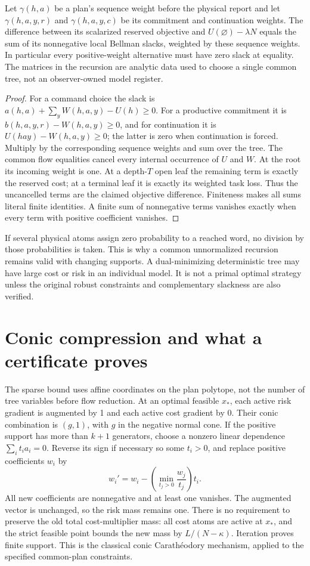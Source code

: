 \begin{proposition}\label{prop:supp-dual-slack}
Let $\gamma(h,a)$ be a plan's sequence weight before the physical report and let $\gamma(h,a,y,r)$ and $\gamma(h,a,y,c)$ be its commitment and continuation weights. The difference between its scalarized reserved objective and $U(\varnothing)-\lambda N$ equals the sum of its nonnegative local Bellman slacks, weighted by these sequence weights. In particular every positive-weight alternative must have zero slack at equality. The matrices in the recursion are analytic data used to choose a single common tree, not an observer-owned model register.
\end{proposition}
\begin{proof}
For a command choice the slack is
$a(h,a)+\sum_yW(h,a,y)-U(h)\ge0$.
For a productive commitment it is $b(h,a,y,r)-W(h,a,y)\ge0$, and for continuation it is $U(hay)-W(h,a,y)\ge0$; the latter is zero when continuation is forced. Multiply by the corresponding sequence weights and sum over the tree. The common flow equalities cancel every internal occurrence of $U$ and $W$. At the root its incoming weight is one. At a depth-$T$ open leaf the remaining term is exactly the reserved cost; at a terminal leaf it is exactly its weighted task loss. Thus the uncancelled terms are the claimed objective difference. Finiteness makes all sums literal finite identities. A finite sum of nonnegative terms vanishes exactly when every term with positive coefficient vanishes.
\end{proof}

If several physical atoms assign zero probability to a reached word, no division by those probabilities is taken. This is why a common unnormalized recursion remains valid with changing supports. A dual-minimizing deterministic tree may have large cost or risk in an individual model. It is not a primal optimal strategy unless the original robust constraints and complementary slackness are also verified.

\section{Conic compression and what a certificate proves}
The sparse bound uses affine coordinates on the plan polytope, not the number of tree variables before flow reduction. At an optimal feasible $x_*$, each active risk gradient is augmented by 1 and each active cost gradient by 0. Their conic combination is $(g,1)$, with $g$ in the negative normal cone. If the positive support has more than $k+1$ generators, choose a nonzero linear dependence $\sum_i t_i a_i=0$. Reverse its sign if necessary so some $t_i>0$, and replace positive coefficients $w_i$ by
\[
 w_i'=w_i-\left(\min_{t_j>0}\frac{w_j}{t_j}\right)t_i.
\]
All new coefficients are nonnegative and at least one vanishes. The augmented vector is unchanged, so the risk mass remains one. There is no requirement to preserve the old total cost-multiplier mass: all cost atoms are active at $x_*$, and the strict feasible point bounds the new mass by $L/(N-\kappa)$. Iteration proves finite support. This is the classical conic Carath\'eodory mechanism, applied to the specified common-plan constraints.

